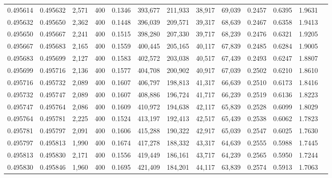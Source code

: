 \begin{tabular}{rrrrrrrrrrrrr}
0.495614 & 0.495632 &  2,571 & 400 &                                     0.1346 & 393,677 & 211,933 &  38,917 &  69,039 & 0.2457 & 0.6395 & 1.9631 \\
0.495632 & 0.495650 &  2,362 & 400 &                                     0.1448 & 396,039 & 209,571 &  39,317 &  68,639 & 0.2467 & 0.6358 & 1.9413 \\
0.495650 & 0.495667 &  2,241 & 400 &                                     0.1515 & 398,280 & 207,330 &  39,717 &  68,239 & 0.2476 & 0.6321 & 1.9205 \\
0.495667 & 0.495683 &  2,165 & 400 &                                     0.1559 & 400,445 & 205,165 &  40,117 &  67,839 & 0.2485 & 0.6284 & 1.9005 \\
0.495683 & 0.495699 &  2,127 & 400 &                                     0.1583 & 402,572 & 203,038 &  40,517 &  67,439 & 0.2493 & 0.6247 & 1.8807 \\
0.495699 & 0.495716 &  2,136 & 400 &                                     0.1577 & 404,708 & 200,902 &  40,917 &  67,039 & 0.2502 & 0.6210 & 1.8610 \\
0.495716 & 0.495732 &  2,089 & 400 &                                     0.1607 & 406,797 & 198,813 &  41,317 &  66,639 & 0.2510 & 0.6173 & 1.8416 \\
0.495732 & 0.495747 &  2,089 & 400 &                                     0.1607 & 408,886 & 196,724 &  41,717 &  66,239 & 0.2519 & 0.6136 & 1.8223 \\
0.495747 & 0.495764 &  2,086 & 400 &                                     0.1609 & 410,972 & 194,638 &  42,117 &  65,839 & 0.2528 & 0.6099 & 1.8029 \\
0.495764 & 0.495781 &  2,225 & 400 &                                     0.1524 & 413,197 & 192,413 &  42,517 &  65,439 & 0.2538 & 0.6062 & 1.7823 \\
0.495781 & 0.495797 &  2,091 & 400 &                                     0.1606 & 415,288 & 190,322 &  42,917 &  65,039 & 0.2547 & 0.6025 & 1.7630 \\
0.495797 & 0.495813 &  1,990 & 400 &                                     0.1674 & 417,278 & 188,332 &  43,317 &  64,639 & 0.2555 & 0.5988 & 1.7445 \\
0.495813 & 0.495830 &  2,171 & 400 &                                     0.1556 & 419,449 & 186,161 &  43,717 &  64,239 & 0.2565 & 0.5950 & 1.7244 \\
0.495830 & 0.495846 &  1,960 & 400 &                                     0.1695 & 421,409 & 184,201 &  44,117 &  63,839 & 0.2574 & 0.5913 & 1.7063 \\

\end{tabular}
